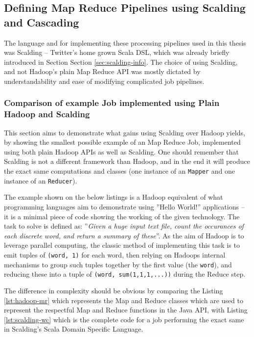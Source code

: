 \subsection{Defining Map Reduce Pipelines using Scalding and Cascading}
\label{sec:scalding-jobs}
The language and for implementing these processing pipelines used in this thesis was Scalding -- Twitter's home grown Scala DSL, which was already briefly introduced in Section Section \ref{sec:scalding-info}. The choice of using Scalding, and not Hadoop's plain Map Reduce API was mostly dictated by understandability and ease of modifying complicated job pipelines. 

\subsubsection{Comparison of example Job implemented using Plain Hadoop and Scalding}

This section aims to demonstrate what gains using Scalding over Hadoop yields, by showing the smallest possible example of an Map Reduce Job, implemented using both plain Hadoop APIs as well as Scalding. One should remember that Scalding is not a different framework than Hadoop, and in the end it will produce the exact same computations and classes (one instance of an \verb|Mapper| and one instance of an \verb|Reducer|).

The example shown on the below listings is a Hadoop equivalent of what programming languages aim to demonstrate using ''Hello World!'' applications -- it is a minimal piece of code showing the working of the given technology. The task to solve is defined as: ''\textit{Given a huge input text file, count the occurances of each discrete word, and return a summary of these}''. As the aim of Hadoop is to leverage parallel computing, the classic method of implementing this task is to emit tuples of \verb|(word, 1)| for each word, then relying on Hadoops internal mechanisms to group such tuples together by the first value (the \verb|word|), and reducing these into a tuple of \verb|(word, sum(1,1,1,...))| during the Reduce step.

The difference in complexity should be obvious by comparing the Listing \ref{lst:hadoop-mr} which represents the Map and Reduce classes which are used to represent the respectful Map and Reduce functions in the Java API, with Listing \ref{lst:scalding-wc} which is the complete code for a job performing the exact same in Scalding's Scala Domain Specific Language. 

